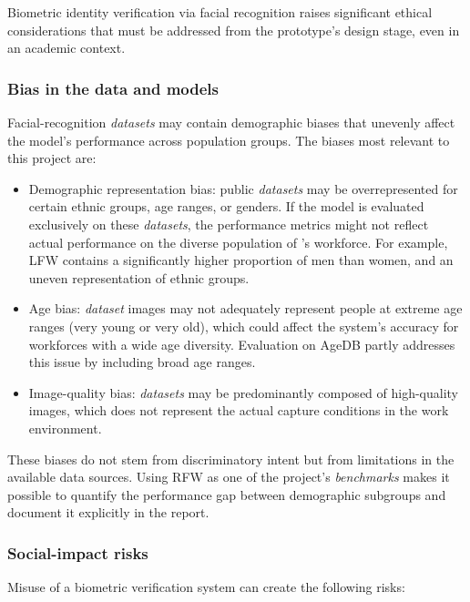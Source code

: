 \documentclass[
  11pt, %
]{charter}
\begin{document}
Biometric identity verification via facial recognition raises significant ethical considerations that must be addressed from the prototype's design stage, even in an academic context.

\subsubsection{Bias in the data and models}

Facial-recognition \textit{datasets} may contain demographic biases that unevenly affect the model's performance across population groups. The biases most relevant to this project are:

\begin{itemize}
  \item Demographic representation bias: public \textit{datasets} may be overrepresented for certain ethnic groups, age ranges, or genders. If the model is evaluated exclusively on these \textit{datasets}, the performance metrics might not reflect actual performance on the diverse population of \empclientename's\hspace{1px} workforce. For example, LFW contains a significantly higher proportion of men than women, and an uneven representation of ethnic groups.
  \item Age bias: \textit{dataset} images may not adequately represent people at extreme age ranges (very young or very old), which could affect the system's accuracy for workforces with a wide age diversity. Evaluation on AgeDB partly addresses this issue by including broad age ranges.
  \item Image-quality bias: \textit{datasets} may be predominantly composed of high-quality images, which does not represent the actual capture conditions in the work environment.
\end{itemize}

These biases do not stem from discriminatory intent but from limitations in the available data sources. Using RFW as one of the project's \textit{benchmarks} makes it possible to quantify the performance gap between demographic subgroups and document it explicitly in the report.

\subsubsection{Social-impact risks}

Misuse of a biometric verification system can create the following risks:
\end{document}
